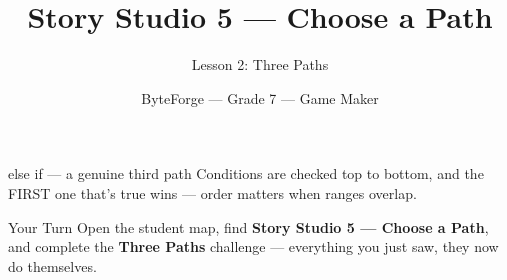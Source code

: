 \documentclass[aspectratio=169]{beamer}
\title{Story Studio 5 — Choose a Path}
\subtitle{Lesson 2: Three Paths}
\author{ByteForge --- Grade 7 --- Game Maker}
\date{}
\begin{document}
\begin{frame}
    \titlepage
\end{frame}

\begin{frame}{else if — a genuine third path}
    \Large
    Conditions are checked top to bottom, and the FIRST one that's true wins — order matters when ranges overlap.
\end{frame}

\begin{frame}{Your Turn}
    \Large
    Open the student map, find \textbf{Story Studio 5 — Choose a Path}, and complete
    the \textbf{Three Paths} challenge --- everything you just saw, they now do themselves.
\end{frame}
\end{document}

